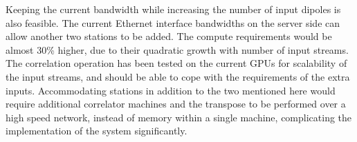 \documentclass{ws-jai}
\begin{document}
Keeping the  current bandwidth while increasing  the number of input  dipoles is
also feasible. The current Ethernet interface  bandwidths on the server side can
allow  another two  stations to  be added.   The compute  requirements would  be
almost 30\% higher, due to their  quadratic growth with number of input streams.
The correlation operation has been tested on the current GPUs for scalability of
the input streams, and should be able to cope with the requirements of the extra
inputs.   Accommodating stations  in addition  to the  two mentioned  here would
require additional correlator machines and the  transpose to be performed over a
high speed network, instead of memory  within a single machine, complicating the
implementation of the system significantly.\\

\end{document}
